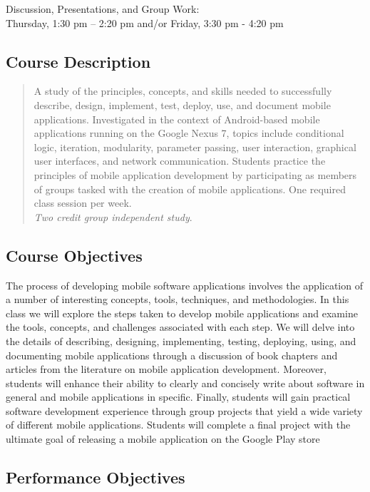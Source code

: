 Discussion, Presentations, and Group Work: \\ Thursday, 1:30 pm -- 2:20 pm and/or Friday, 3:30 pm - 4:20 pm 

\subsection*{Course Description}

\begin{quote}

	A study of the principles, concepts, and skills needed to successfully describe, design, implement, test, deploy,
	use, and document mobile applications.  Investigated in the context of Android-based mobile applications running on
	the Google Nexus 7, topics include conditional logic, iteration, modularity, parameter passing, user interaction,
	graphical user interfaces, and network communication. Students practice the principles of mobile application
	development by participating as members of groups tasked with the creation of mobile applications.  One required
	class session per week. \\ {\em Two credit group independent study}.
	
\end{quote}

\subsection*{Course Objectives}

The process of developing mobile software applications involves the application of a number of interesting concepts,
tools, techniques, and methodologies.  In this class we will explore the steps taken to develop mobile
applications and examine the tools, concepts, and challenges associated with each step.  We will delve into the details
of describing, designing, implementing, testing, deploying, using, and documenting mobile applications through a
discussion of book chapters and articles from the literature on mobile application development.  Moreover, students will
enhance their ability to clearly and concisely write about software in general and mobile applications in specific.
Finally, students will gain practical software development experience through group projects that yield a wide variety
of different mobile applications. Students will complete a final project with the ultimate goal of releasing a mobile
application on the Google Play store

\subsection*{Performance Objectives}

